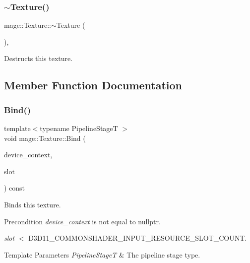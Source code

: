 \subsubsection{\texorpdfstring{$\sim$\+Texture()}{~Texture()}}
{\footnotesize\ttfamily mage\+::\+Texture\+::$\sim$\+Texture (\begin{DoxyParamCaption}{ }\end{DoxyParamCaption})\hspace{0.3cm}{\ttfamily [virtual]}, {\ttfamily [default]}}

Destructs this texture. 

\subsection{Member Function Documentation}
\hypertarget{classmage_1_1_texture_a3e26e9f6a1f4113e3c9fe39759012f61}{}\label{classmage_1_1_texture_a3e26e9f6a1f4113e3c9fe39759012f61} 
\subsubsection{\texorpdfstring{Bind()}{Bind()}}
{\footnotesize\ttfamily template$<$typename Pipeline\+StageT $>$ \\
void mage\+::\+Texture\+::\+Bind (\begin{DoxyParamCaption}\item[{I\+D3\+D11\+Device\+Context4 $\ast$}]{device\+\_\+context,  }\item[{\hyperlink{namespacemage_a41c104c036fba3756a74e19f793eeaa1}{U32}}]{slot }\end{DoxyParamCaption}) const\hspace{0.3cm}{\ttfamily [noexcept]}}

Binds this texture.

\begin{DoxyPrecond}{Precondition}
{\itshape device\+\_\+context} is not equal to {\ttfamily nullptr}. 

{\itshape slot} $<$ {\ttfamily D3\+D11\+\_\+\+C\+O\+M\+M\+O\+N\+S\+H\+A\+D\+E\+R\+\_\+\+I\+N\+P\+U\+T\+\_\+\+R\+E\+S\+O\+U\+R\+C\+E\+\_\+\+S\+L\+O\+T\+\_\+\+C\+O\+U\+NT}. 
\end{DoxyPrecond}

\begin{DoxyTemplParams}{Template Parameters}
{\em Pipeline\+StageT} & The pipeline stage type. \\
\hline
\end{DoxyTemplParams}

